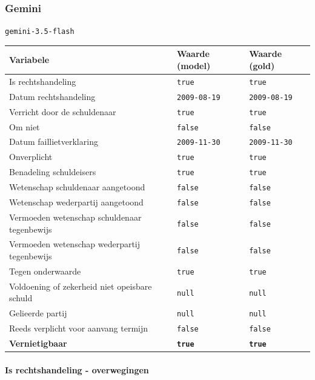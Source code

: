 \documentclass[
  dutch,
  a4paper,
]{article}
\begin{document}
\newpage


\subsubsection{Gemini}\label{gemini-23}

\texttt{gemini-3.5-flash}

\begin{center}
\small
\begin{tabular}{@{}p{7.4cm}p{2.6cm}p{2.6cm}@{}}
\toprule
Variabele & Waarde (model) & Waarde (gold) \\
\midrule
Is rechtshandeling & \texttt{true} & \texttt{true} \\
Datum rechtshandeling & \texttt{2009-08-19} & \texttt{2009-08-19} \\
Verricht door de schuldenaar & \texttt{true} & \texttt{true} \\
Om niet & \texttt{false} & \texttt{false} \\
Datum faillietverklaring & \texttt{2009-11-30} & \texttt{2009-11-30} \\
Onverplicht & \texttt{true} & \texttt{true} \\
Benadeling schuldeisers & \texttt{true} & \texttt{true} \\
Wetenschap schuldenaar aangetoond & \texttt{false} & \texttt{false} \\
Wetenschap wederpartij aangetoond & \texttt{false} & \texttt{false} \\
Vermoeden wetenschap schuldenaar tegenbewijs & \texttt{false} & \texttt{false} \\
Vermoeden wetenschap wederpartij tegenbewijs & \texttt{false} & \texttt{false} \\
Tegen onderwaarde & \texttt{true} & \texttt{true} \\
Voldoening of zekerheid niet opeisbare schuld & \texttt{null} & \texttt{null} \\
Gelieerde partij & \texttt{null} & \texttt{null} \\
Reeds verplicht voor aanvang termijn & \texttt{false} & \texttt{false} \\
\textbf{Vernietigbaar} & \textbf{\texttt{true}} & \textbf{\texttt{true}} \\
\bottomrule
\end{tabular}
\end{center}

\paragraph{Is rechtshandeling - overwegingen}\label{is-rechtshandeling---overwegingen-71}
\end{document}
